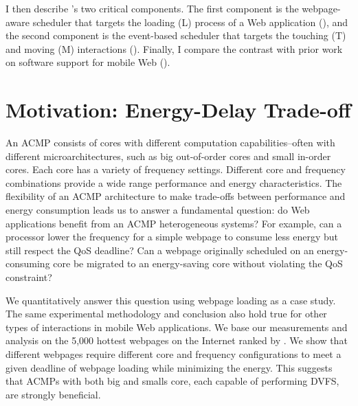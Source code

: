 I then describe \webrt's two critical components. The first component is the webpage-aware scheduler that targets the loading (L) process of a Web application (), and the second component is the event-based scheduler that targets the touching (T) and moving (M) interactions (). Finally, I compare the contrast \webrt with prior work on software support for mobile Web ().

\section{Motivation: Energy-Delay Trade-off}
\label{sec:runtime:char}



An ACMP consists of cores with different computation capabilities--often with different microarchitectures, such as big out-of-order cores and small in-order cores. Each core has a variety of frequency settings. Different core and frequency combinations provide a wide range performance and energy characteristics. The flexibility of an ACMP architecture to make trade-offs between performance and energy consumption leads us to answer a fundamental question: do Web applications benefit from an ACMP heterogeneous systems?  For example, can a processor lower the frequency for a simple webpage to consume less energy but still respect the QoS deadline? Can a webpage originally scheduled on an energy-consuming core be migrated to an energy-saving core without violating the QoS constraint?

We quantitatively answer this question using webpage loading as a case study. The same experimental methodology and conclusion also hold true for other types of interactions in mobile Web applications. We base our measurements and analysis on the 5,000 hottest webpages on the Internet ranked by . We show that different webpages require different core and frequency configurations to meet a given deadline of webpage loading while minimizing the energy. This suggests that ACMPs with both big and smalls core, each capable of performing DVFS, are strongly beneficial.

